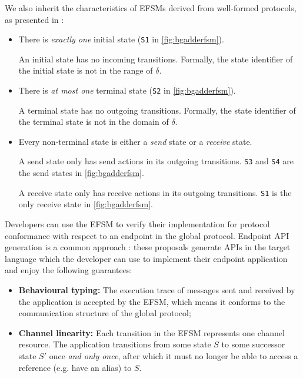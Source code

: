 We also inherit the characteristics of EFSMs derived
from well-formed protocols, as presented in \cite{Hybrid2016}:

\begin{itemize}
\item 
There is \textit{exactly one} initial state 
(\texttt{S1} in \cref{fig:bgadderfsm}).

An initial state has no incoming transitions.
Formally, the state identifier of the initial state
is not in the range of $\delta$.

\item 
There is \textit{at most one} terminal state 
(\texttt{S2} in \cref{fig:bgadderfsm}).

A terminal state has no outgoing transitions.
Formally, the state identifier of the terminal state
is not in the domain of $\delta$.

\item
Every non-terminal state is either a \textit{send}
state or a \textit{receive} state.

A send state only has send actions in its
outgoing transitions. \texttt{S3} and \texttt{S4}
are the send states in \cref{fig:bgadderfsm}.

A receive state only has receive actions in its
outgoing transitions. \texttt{S1} is the only
receive state in \cref{fig:bgadderfsm}.
\end{itemize}

Developers can use the EFSM to verify their implementation
for protocol conformance with respect to an endpoint
in the global protocol.
Endpoint API generation is a common approach
\cite{HuJava,Hybrid2016,Python2017,PureScript2019,LinearDecomp}:
these proposals generate APIs in the target language
which the developer
can use to implement their endpoint application
and enjoy the following guarantees:

\begin{itemize}

\item \textbf{Behavioural typing:}
The execution trace of messages sent and received by
the application is accepted by the EFSM, which means it
conforms to the communication structure of the global protocol;

\item \textbf{Channel linearity:}
Each transition in the EFSM represents one channel resource.
The application transitions from some state $S$
to some successor state $S'$
once \textit{and only once},
after which it must no longer
be able to access a reference (e.g. have an alias) to $S$.
\end{itemize}

